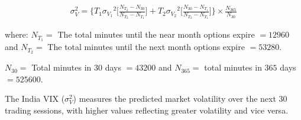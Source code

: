\documentclass[conference]{IEEEtran}
\begin{document}
\begin{align}
   \sigma_{V}^{2} = \Big\{T_{1}{\sigma_{V_{1}}}^{2}\Big[\frac{N_{T_{2}} - N_{30}}{N_{T_{2}} - N_{T_{1}}}\Big] + T_{2}{\sigma_{V_{2}}}^{2}\Big[\frac{N_{30} - N_{T_{1}}}{N_{T_{2}} - N_{T_{1}}}\Big]\Big\} \times \frac{N_{365}}{N_{30}} \label{eq: 7}
\end{align}

\noindent where: $N_{T_{1}} =$ The total minutes until the near month options expire $= 12960$ and $N_{T_{2}} =$ The total minutes until the next month options expire $= 53280$. \newline

$N_{30} =$ Total minutes in $30$ days $= 43200$ and $N_{365} =$ total minutes in $365$ days $= 525600$. \newline

The India VIX ($\sigma_{V}^{2}$) measures the predicted market volatility over the next 30 trading sessions, with higher values reflecting greater volatility and vice versa.



\end{document}
